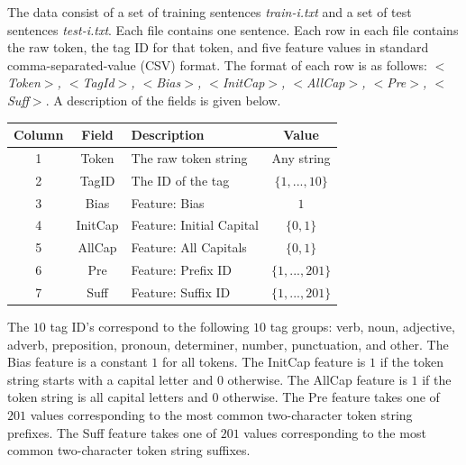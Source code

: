 \documentclass{article}
\begin{document}
The data consist of a set of training sentences \textit{train-i.txt} and a set of test sentences \textit{test-i.txt}. Each file contains one sentence. Each row in each file contains the raw token, the tag ID for that token, and five feature values in standard comma-separated-value (CSV) format. The format of each row is as follows: \textit{$<$Token$>$, $<$TagId$>$, $<$Bias$>$, $<$InitCap$>$, $<$AllCap$>$, $<$Pre$>$, $<$Suff$>$}. A description of the fields is given below.

\begin{center}
\begin{tabular}{|c|c|l|c|}\hline
Column  & Field  & Description               & Value\\ \hline\hline
1       & Token  &  The raw token string     & Any string\\ \hline
2       & TagID  &  The ID of the tag        & $\{1,...,10\}$\\ \hline
3       & Bias   &  Feature: Bias            & $1$\\ \hline
4       & InitCap&  Feature: Initial Capital & $\{0,1\}$\\ \hline
5       & AllCap &  Feature: All Capitals    & $\{0,1\}$\\ \hline
6       & Pre    &  Feature: Prefix ID       & $\{1,...,201\}$\\ \hline
7       & Suff   &  Feature: Suffix ID       & $\{1,...,201\}$\\ \hline
\end{tabular}
\end{center}

The $10$ tag ID's correspond to the following $10$ tag groups: verb, noun, adjective, adverb, preposition, pronoun, determiner, number, punctuation, and other. The Bias feature is a constant $1$ for all tokens. The InitCap feature is $1$ if the token string starts with a capital letter and $0$ otherwise. The AllCap feature is $1$ if the token string is all capital letters and $0$ otherwise. The Pre feature takes one of $201$ values corresponding to the most common two-character token string prefixes. The Suff feature takes one of $201$ values corresponding to the most common two-character token string suffixes.
\end{document}
